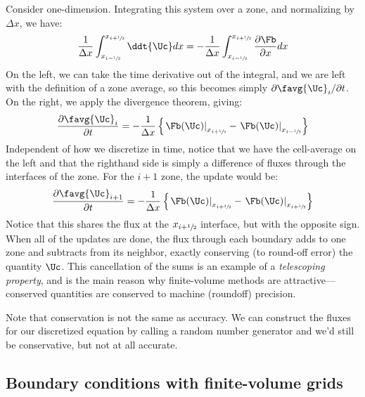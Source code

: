 Consider one-dimension.
Integrating this system over a zone, and normalizing by $\Delta x$, we have:
\begin{equation}
\frac{1}{\Delta x} \int_{x_{i-\myhalf}}^{x_{i+\myhalf}} \ddt{\Uc} dx =
  -\frac{1}{\Delta x} \int_{x_{i-\myhalf}}^{x_{i+\myhalf}} \frac{\partial \Fb}{\partial x} dx
\end{equation}
On the left, we can take the time derivative out of the integral, and
we are left with the definition of a zone average, so this becomes
simply $\partial \favg{\Uc}_i/\partial t$.  On the right, we
apply the divergence theorem, giving:
\begin{equation}
\frac{\partial \favg{\Uc}_i}{\partial t} =
  - \frac{1}{\Delta x} \left \{ \left . \Fb(\Uc) \right |_{x_{i+\myhalf}} -
                                \left . \Fb(\Uc) \right |_{x_{i-\myhalf}} \right \}
\end{equation}
Independent of how we discretize in time, notice that we have the cell-average
on the left and that the righthand side
is simply a difference of fluxes through the interfaces of the zone.
For the $i+1$ zone, the update would be:
\begin{equation}
\label{eq:consup}
\frac{\partial \favg{\Uc}_{i+1}}{\partial t} =
  - \frac{1}{\Delta x} \left \{ \left . \Fb(\Uc) \right |_{x_{i+\mythreehalf}} -
                                \left . \Fb(\Uc) \right |_{x_{i+\myhalf}} \right \}
\end{equation}
Notice that this shares the flux at the $x_{i+{\sfrac{1}{2}}}$ interface, but with the
opposite sign.   When all of the updates are done, the flux through each
boundary adds to one zone and subtracts from its neighbor, exactly conserving
(to round-off error) the quantity $\Uc$.  This cancellation of the sums
is an example of a {\em telescoping property}, and is the main reason
why finite-volume methods are attractive---conserved quantities are
conserved to machine (roundoff) precision.

Note that conservation is not the same as accuracy.  We can construct
the fluxes for our discretized equation by calling a random number
generator and we'd still be conservative, but not at all accurate.

\subsection{Boundary conditions with finite-volume grids}

\label{sec:fv:bcs}

